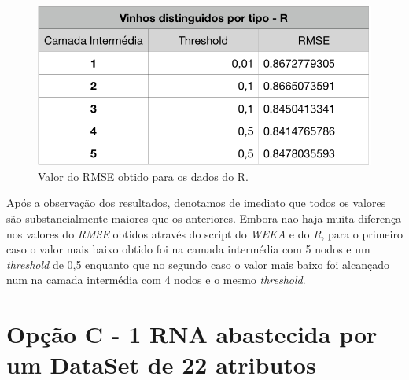 \documentclass{report}
\begin{document}
\begin{figure}[H]
\centering
\includegraphics[scale=0.5]{tabelas/6} 
\caption{Valor do RMSE obtido para os dados do R.}
\end{figure} 

\bigskip


Após a observação dos resultados, denotamos de imediato que todos os valores são substancialmente maiores que os anteriores. Embora nao haja muita diferença nos valores do \textit{RMSE} obtidos através do script do \textit{WEKA} e do \textit{R}, para o primeiro caso o valor mais baixo obtido foi na camada intermédia com 5 nodos e um \textit{threshold} de 0,5 enquanto que no segundo caso o valor mais baixo foi alcançado num na camada intermédia com 4 nodos e o mesmo \textit{threshold}.






































\section{Opção C - 1 RNA abastecida por um DataSet de 22 atributos}
\end{document}
